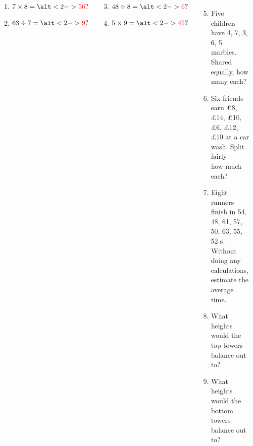 \documentclass{beamer}
\newcommand{\ashow}[1]{\uncover<2->{\textcolor{red}{\small #1}}}
\newcommand{\ashowq}[1]{\alt<2->{\textcolor{red}{\small #1}}{?}}
\begin{document}
\begin{frame}
\begin{columns}[T]
\footnotesize
\vspace{0.2em}
  \begin{multicols}{2}
  \begin{enumerate}
    \item $7 \times 8 = \ashowq{56}$
    \item $63 \div 7 = \ashowq{9}$
    \end{enumerate}
  \end{multicols}
  \begin{multicols}{2}
  \begin{enumerate}
  \setcounter{enumi}{2}
    \item $48 \div 8 = \ashowq{6}$
    \item $5 \times 9 = \ashowq{45}$
    \end{enumerate}
  \end{multicols}
  \begin{enumerate}
  \setcounter{enumi}{4}
  \item Five children have 4, 7, 3, 6, 5 marbles. Shared equally, how many each? \ashow{5 marbles}
  \item Six friends earn £8, £14, £10, £6, £12, £10 at a car wash. Split fairly — how much each? \ashow{\pounds10 each}
  \item Eight runners finish in 54, 48, 61, 57, 50, 63, 55, 52 s. Without doing any calculations, estimate the average time. \ashow{about 55 s}
  \item What heights would the top towers balance out to? \ashow{5 bricks high}
  \item What heights would the bottom towers balance out to? \ashow{4 bricks high}
\end{enumerate}

\end{columns}
\end{frame}
\end{document}
